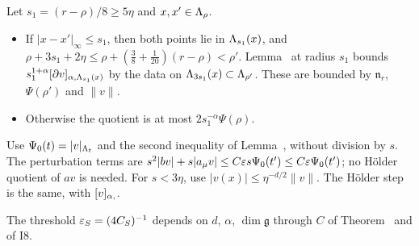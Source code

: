 \begin{detail}
\begin{step}
\end{step}
\begin{step}
Let $s_1=(r-\rho)/8\ge5\eta$ and $x,x'\in\Lambda_\rho$.
\begin{itemize}
\item If $|x-x'|_\infty\le s_1$, then both points lie in $\Lambda_{s_1}(x)$, and $\rho+3s_1+2\eta\le\rho+(\frac38+\frac1{20})(r-\rho)<\rho'$. Lemma~ at radius $s_1$ bounds $s_1^{1+\alpha}[\partial v]_{\alpha,\Lambda_{s_1}(x)}$ by the data on $\Lambda_{3s_1}(x)\subset\Lambda_{\rho'}$. These are bounded by $\mathfrak n_r$, $\Psi(\rho')$ and $\|v\|$.
\item Otherwise the quotient is at most $2s_1^{-\alpha}\Psi(\rho)$.
\end{itemize}
\end{step}
\begin{step}
Use $\Psi_0(t)=|v|_{\Lambda_t}$ and the second inequality of Lemma~, without division by $s$. The perturbation terms are $s^2|bv|+s|a_\mu v|\le C\varepsilon s\Psi_0(t')\le C\varepsilon\Psi_0(t')$; no H\"older quotient of $av$ is needed. For $s<3\eta$, use $|v(x)|\le\eta^{-d/2}\|v\|$. The H\"older step is the same, with $[v]_{\alpha,}$.
\end{step}
The threshold $\varepsilon_S=(4C_S)^{-1}$ depends on $d$, $\alpha$, $\dim\mathfrak g$ through $C$ of Theorem~ and of I8.
\end{detail}

